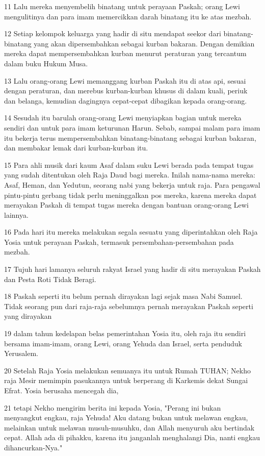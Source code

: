 \par 11 Lalu mereka menyembelih binatang untuk perayaan Paskah; orang Lewi mengulitinya dan para imam memercikkan darah binatang itu ke atas mezbah.
\par 12 Setiap kelompok keluarga yang hadir di situ mendapat seekor dari binatang-binatang yang akan dipersembahkan sebagai kurban bakaran. Dengan demikian mereka dapat mempersembahkan kurban menurut peraturan yang tercantum dalam buku Hukum Musa.
\par 13 Lalu orang-orang Lewi memanggang kurban Paskah itu di atas api, sesuai dengan peraturan, dan merebus kurban-kurban khusus di dalam kuali, periuk dan belanga, kemudian dagingnya cepat-cepat dibagikan kepada orang-orang.
\par 14 Sesudah itu barulah orang-orang Lewi menyiapkan bagian untuk mereka sendiri dan untuk para imam keturunan Harun. Sebab, sampai malam para imam itu bekerja terus mempersembahkan binatang-binatang sebagai kurban bakaran, dan membakar lemak dari kurban-kurban itu.
\par 15 Para ahli musik dari kaum Asaf dalam suku Lewi berada pada tempat tugas yang sudah ditentukan oleh Raja Daud bagi mereka. Inilah nama-nama mereka: Asaf, Heman, dan Yedutun, seorang nabi yang bekerja untuk raja. Para pengawal pintu-pintu gerbang tidak perlu meninggalkan pos mereka, karena mereka dapat merayakan Paskah di tempat tugas mereka dengan bantuan orang-orang Lewi lainnya.
\par 16 Pada hari itu mereka melakukan segala sesuatu yang diperintahkan oleh Raja Yosia untuk perayaan Paskah, termasuk persembahan-persembahan pada mezbah.
\par 17 Tujuh hari lamanya seluruh rakyat Israel yang hadir di situ merayakan Paskah dan Pesta Roti Tidak Beragi.
\par 18 Paskah seperti itu belum pernah dirayakan lagi sejak masa Nabi Samuel. Tidak seorang pun dari raja-raja sebelumnya pernah merayakan Paskah seperti yang dirayakan
\par 19 dalam tahun kedelapan belas pemerintahan Yosia itu, oleh raja itu sendiri bersama imam-imam, orang Lewi, orang Yehuda dan Israel, serta penduduk Yerusalem.
\par 20 Setelah Raja Yosia melakukan semuanya itu untuk Rumah TUHAN; Nekho raja Mesir memimpin pasukannya untuk berperang di Karkemis dekat Sungai Efrat. Yosia berusaha mencegah dia,
\par 21 tetapi Nekho mengirim berita ini kepada Yosia, "Perang ini bukan menyangkut engkau, raja Yehuda! Aku datang bukan untuk melawan engkau, melainkan untuk melawan musuh-musuhku, dan Allah menyuruh aku bertindak cepat. Allah ada di pihakku, karena itu janganlah menghalangi Dia, nanti engkau dihancurkan-Nya."
